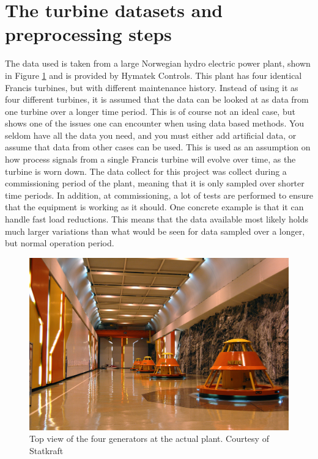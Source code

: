 \section{The turbine datasets and preprocessing steps }
    The data used is taken from a large Norwegian hydro electric power plant, shown in Figure \ref{fig:kvilldal} and is provided by Hymatek Controls. This plant has four identical Francis turbines, but with different maintenance history. Instead of using it as four different turbines, it is assumed that the data can be looked at as data from one turbine over a longer time period. This is of course not an ideal case, but shows one of the issues one can encounter when using data based methods. You seldom have all the data you need, and you must either add artificial data, or assume that data from other cases can be used. This is used as an assumption on how process signals from a single Francis turbine will evolve over time, as the turbine is worn down. The data collect for this project was collect during a commissioning period of the plant, meaning that it is only sampled over shorter time periods. In addition, at commissioning, a lot of tests are performed to ensure that the equipment is working as it should. One concrete example is that it can handle fast load reductions. This means that the data available most likely holds much larger variations than what would be seen for data sampled over a longer, but normal operation period.   
    
    \begin{figure}
        \centering
        \includegraphics{figures/introduction/Kvilldal.jpg}
        \caption{Top view of the four generators at the actual plant. Courtesy of Statkraft}
        \label{fig:kvilldal}
    \end{figure}
    
